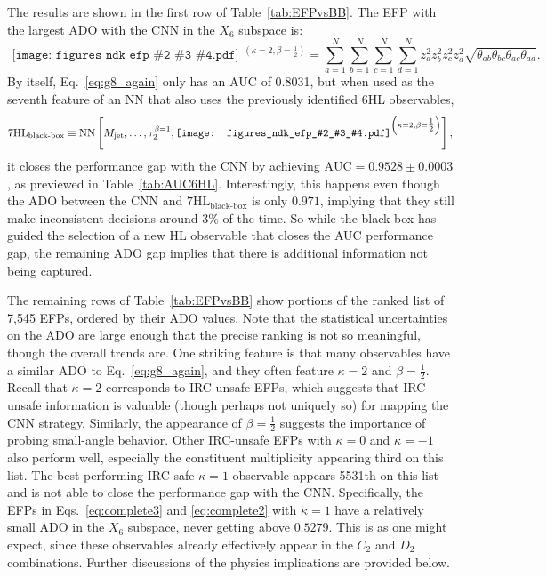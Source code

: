 \documentclass[aps,prd,twocolumn,superscriptaddress,preprintnumbers,nofootinbib,longbibliography,floatfix]{revtex4-1}
\newcommand{\CNN}{\text{CNN}}
\newcommand{\NN}{\text{NN}}
\newcommand{\HL}{\text{HL}}
\newcommand{\AUC}{\text{AUC}}
\newcommand{\Tab}[1]{Table~\ref{#1}}
\newcommand{\Eq}[1]{Eq.~\eqref{#1}}
\newcommand{\Eqs}[2]{Eqs.~\eqref{#1} and \eqref{#2}}
\newcommand{\ndk}[4]{
	\begin{gathered}\texttt{[image: figures\_ndk\_efp\_\#2\_\#3\_\#4.pdf]}\end{gathered}
}
\begin{document}
The results are shown in the first row of \Tab{tab:EFPvsBB}. The EFP with the largest ADO with the CNN in the $X_6$ subspace is:
\begin{equation}
	\label{eq:g8_again}
	\ndk{0.045}{4}{4}{3} {}^{\left(\kappa = 2, \beta = \tfrac{1}{2}\right)} = \sum_{a=1}^{N} \sum_{b=1}^{N} \sum_{c=1}^{N} \sum_{d=1}^{N} z^{2}_a z^{2}_b z^{2}_c z^{2}_d \sqrt{\theta_{ab} \theta_{bc} \theta_{ac} \theta_{ad}}.
\end{equation}
By itself, \Eq{eq:g8_again} only has an $\AUC$ of 0.8031,  but when used as the seventh feature of an NN that also uses the previously identified 6HL observables,
\begin{equation}
	7\HL_{\text{black-box}} \equiv \NN\left[M_{\text{jet}}, \ldots,\tau_2^{\beta=1}, 	\ndk{0.045}{4}{4}{3} {}^{\left(\kappa = 2, \beta = \tfrac{1}{2}\right)} \right],\\
\end{equation}
it closes the performance gap with the $\CNN$ by achieving $\AUC = 0.9528 \pm 0.0003$, as previewed in \Tab{tab:AUC6HL}. Interestingly, this happens even though the ADO between the $\CNN$ and $7\HL_{\text{black-box}}$ is only $0.971$, implying that they still make inconsistent decisions around 3\% of the time. So while the black box has guided the selection of a new HL observable that closes the AUC performance gap, the remaining ADO gap implies that there is additional information not being captured.

The remaining rows of \Tab{tab:EFPvsBB} show portions of the ranked list of 7,545 EFPs, ordered by their ADO values. Note that the statistical uncertainties on the ADO are large enough that the precise ranking is not so meaningful, though the overall trends are. One striking feature is that many observables have a similar ADO to \Eq{eq:g8_again}, and they often feature $\kappa = 2$ and $\beta = \frac{1}{2}$. Recall that $\kappa = 2$ corresponds to IRC-unsafe EFPs, which suggests that IRC-unsafe information is valuable (though perhaps not uniquely so) for mapping the $\CNN$ strategy. Similarly, the appearance of $\beta = \frac{1}{2}$ suggests the importance of probing small-angle behavior. Other IRC-unsafe EFPs with $\kappa = 0$ and $\kappa = -1$ also perform well, especially the constituent multiplicity appearing third on this list. The best performing IRC-safe $\kappa = 1$ observable appears 5531th on this list and is not able to close the performance gap with the CNN. Specifically, the EFPs in \Eqs{eq:complete3}{eq:complete2} with $\kappa = 1$ have a relatively small ADO in the $X_6$ subspace, never getting above $0.5279$.  This is as one might expect, since these observables already effectively appear in the $C_2$ and $D_2$ combinations. Further discussions of the physics implications are provided below.
\end{document}
